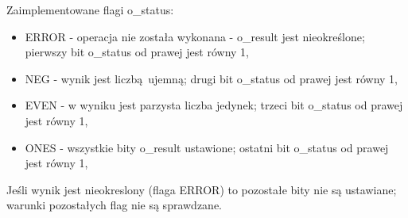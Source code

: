 Zaimplementowane flagi o\_status:

\begin{itemize}
	\item ERROR - operacja nie została wykonana - o\_result jest nieokreślone; pierwszy bit o\_status od prawej jest równy 1,
	\item NEG - wynik jest liczbą ujemną; drugi bit o\_status od prawej jest równy 1,
	\item EVEN - w wyniku jest parzysta liczba jedynek; trzeci bit o\_status od prawej jest równy 1,
	\item ONES - wszystkie bity o\_result ustawione; ostatni bit o\_status od prawej jest równy 1,
\end{itemize}

\noindent
Jeśli wynik jest nieokreslony (flaga ERROR) to pozostałe bity nie są ustawiane; warunki pozostałych flag nie są sprawdzane.